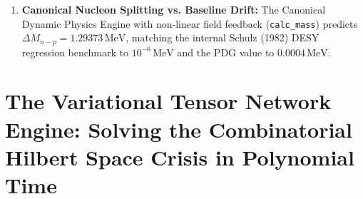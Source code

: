 \documentclass[
    12pt,
    a4paper,
    headings=normal,
    twoside=false,
    open=any,
    parskip=half
]{scrbook}
\begin{document}
\begin{tcolorbox}[colback=maincolor!3!white, colframe=maincolor!80!black, title={\textbf{Grand Synthesis of Chapter 3}}]
\begin{enumerate}[leftmargin=1.5em, itemsep=5pt]
    \item \textbf{Canonical Nucleon Splitting vs. Baseline Drift:} The Canonical Dynamic Physics Engine with non-linear field feedback (\texttt{calc\_mass}) predicts $\Delta M_{n-p} = 1.29373\,\text{MeV}$, matching the internal Schulz (1982) DESY regression benchmark to $10^{-6}\,\text{MeV}$ and the PDG value to $0.0004\,\text{MeV}$.
\end{enumerate}
\end{tcolorbox}

\chapter{The Variational Tensor Network Engine: Solving the Combinatorial Hilbert Space Crisis in Polynomial Time}
\label{chap:ch4_expanded}
\end{document}
